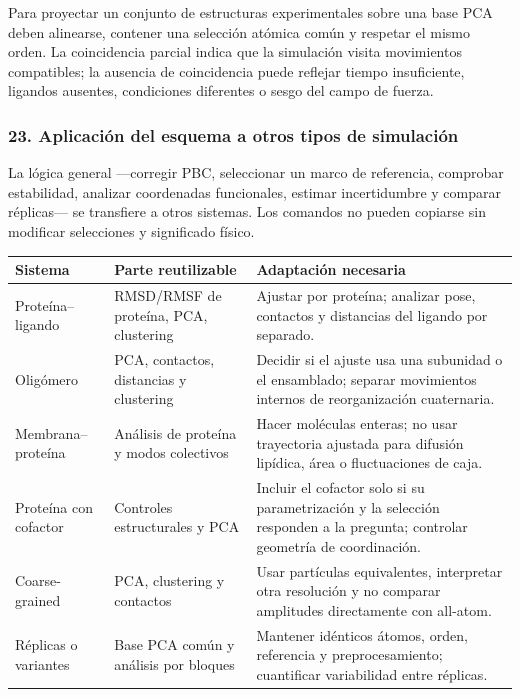 \documentclass[
  spanish,
  11pt,
  a4paper]{article}
\newcounter{none} %
\begin{document}
Para proyectar un conjunto de estructuras experimentales sobre una base
PCA deben alinearse, contener una selección atómica común y respetar el
mismo orden. La coincidencia parcial indica que la simulación visita
movimientos compatibles; la ausencia de coincidencia puede reflejar
tiempo insuficiente, ligandos ausentes, condiciones diferentes o sesgo
del campo de fuerza.

\subsubsection{23. Aplicación del esquema a otros tipos de
simulación}\label{aplicaciuxf3n-del-esquema-a-otros-tipos-de-simulaciuxf3n}

La lógica general ---corregir PBC, seleccionar un marco de referencia,
comprobar estabilidad, analizar coordenadas funcionales, estimar
incertidumbre y comparar réplicas--- se transfiere a otros sistemas. Los
comandos no pueden copiarse sin modificar selecciones y significado
físico.

{\def\LTcaptype{none} %
\begin{longtable}[]{@{}
  >{\raggedright\arraybackslash}p{}
  >{\raggedright\arraybackslash}p{}
  >{\raggedright\arraybackslash}p{}@{}}
\toprule\noalign{}
\begin{minipage}[b]{\linewidth}\raggedright
Sistema
\end{minipage} & \begin{minipage}[b]{\linewidth}\raggedright
Parte reutilizable
\end{minipage} & \begin{minipage}[b]{\linewidth}\raggedright
Adaptación necesaria
\end{minipage} \\
\midrule\noalign{}
\endhead
\bottomrule\noalign{}
\endlastfoot
Proteína--ligando & RMSD/RMSF de proteína, PCA, clustering & Ajustar por
proteína; analizar pose, contactos y distancias del ligando por
separado. \\
Oligómero & PCA, contactos, distancias y clustering & Decidir si el
ajuste usa una subunidad o el ensamblado; separar movimientos internos
de reorganización cuaternaria. \\
Membrana--proteína & Análisis de proteína y modos colectivos & Hacer
moléculas enteras; no usar trayectoria ajustada para difusión lipídica,
área o fluctuaciones de caja. \\
Proteína con cofactor & Controles estructurales y PCA & Incluir el
cofactor solo si su parametrización y la selección responden a la
pregunta; controlar geometría de coordinación. \\
Coarse-grained & PCA, clustering y contactos & Usar partículas
equivalentes, interpretar otra resolución y no comparar amplitudes
directamente con all-atom. \\
Réplicas o variantes & Base PCA común y análisis por bloques & Mantener
idénticos átomos, orden, referencia y preprocesamiento; cuantificar
variabilidad entre réplicas. \\
\end{longtable}
}
\end{document}
